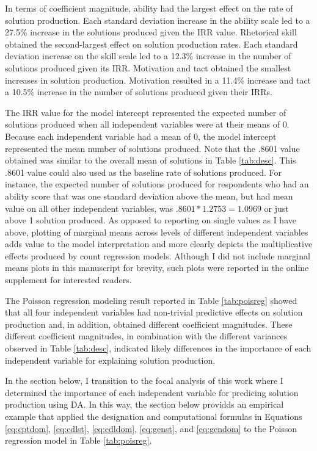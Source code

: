 \documentclass[man]{apa7}
\begin{document}
	In terms of coefficient magnitude, ability had the largest effect on the rate of solution production. 
	Each  standard deviation increase in the ability scale led to a 27.5\% increase in the solutions produced given the IRR value.
	Rhetorical skill obtained the second-largest effect on solution production rates.
	Each standard deviation increase on the skill scale led to a 12.3\% increase in the number of solutions produced given its IRR.
	Motivation and tact obtained the smallest increases in solution production.
	Motivation resulted in a 11.4\% increase and tact a 10.5\% increase in the number of solutions produced given their IRRs. 
	
	The IRR value for the model intercept represented the expected number of solutions produced when all independent variables were at their means of 0.
	Because each independent variable had a mean of 0, the model intercept represented the mean number of solutions produced. 
	Note that the .8601 value obtained was similar to the overall mean of solutions in Table \ref{tab:desc}.
	This .8601 value could also used as the baseline rate of solutions produced.
	For instance, the expected number of solutions produced for respondents who had an ability score that was one standard deviation above the mean, but had mean value on all other independent variables, was $.8601*1.2753 = 1.0969$ or just above 1 solution produced.
	As opposed to reporting on single values as I have above, plotting of marginal means across levels of different independent variables adds value to the model interpretation \parencite[see][for a similar perspective]{ronkko2022eight} and more clearly depicts the multiplicative effects produced by count regression models.
	Although I did not include marginal means plots in this manuscript for brevity, such plots were reported in the online supplement for interested readers.
	
	The Poisson regression modeling result reported in Table \ref{tab:poisreg} showed that all four independent variables had non-trivial predictive effects on solution production and, in addition, obtained different coefficient magnitudes.
	These different coefficient magnitudes, in combination with the different variances observed in Table \ref{tab:desc}, indicated likely differences in the importance of each independent variable for explaining solution production.
	
	In the section below, I transition to the focal analysis of this work where I determined the importance of each independent variable for predicing solution production using DA.
	In this way, the section below providds an empirical example that applied the designation and computational formulas in Equations \ref{eq:cptdom}, \ref{eq:cdlst}, \ref{eq:cdldom}, \ref{eq:genst}, and \ref{eq:gendom} to the Poisson regression model in Table \ref{tab:poisreg}.
	
\end{document}
